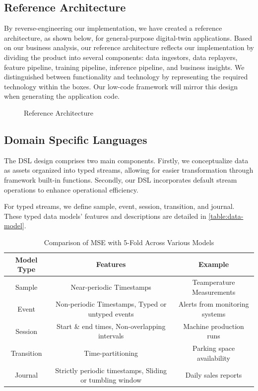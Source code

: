 \subsection{Reference Architecture} 
 By reverse-engineering our implementation, we have created a reference architecture, as shown below, for general-purpose digital-twin applications. Based on our business analysis, our reference architecture reflects our implementation by dividing the product into several components: data ingestors, data replayers, feature pipeline, training pipeline, inference pipeline, and business insights. We distinguished between functionality and technology by representing the required technology within the boxes. Our low-code framework will mirror this design when generating the application code.

\begin{figure}
    \centering
    
    \caption{Reference Architecture}
    \label{fig:ref_arch}
\end{figure}
\subsection{Domain Specific Languages}

 The DSL design comprises two main components. Firstly, we conceptualize data as assets organized into typed streams, allowing for easier transformation through framework built-in functions. Secondly, our DSL incorporates default stream operations to enhance operational efficiency.

For typed streams, we define sample, event, session, transition, and journal. These typed data models' features and descriptions are detailed in \autoref{table:data-model}.

\begin{table}[ht]
\centering
\begin{tabular}{c|c|c}
    Model Type & Features & Example \\ \hline 
    Sample & Near-periodic Timestamps & Teamperature Measurements \\
    Event & Non-periodic Timestamps, Typed or untyped events & Alerts from monitoring systems \\
    Session & Start \& end times, Non-overlapping intervals & Machine production runs \\
    Transition & Time-partitioning & Parking space availability \\
    Journal & Strictly periodic timestamps, Sliding or tumbling window & Daily sales reports
\end{tabular}
\caption{Comparison of MSE with 5-Fold Across Various Models}
\label{table:data-model}
\end{table}

